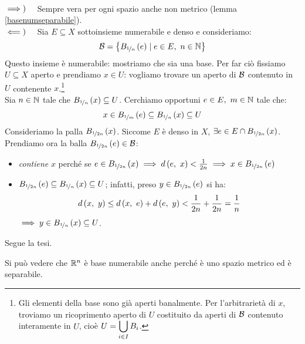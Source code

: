 \begin{demonstration}~{}\\
$\implies)\quad$ Sempre vera per ogni spazio anche non metrico (lemma \ref{basenumseparabile}).\\
$\impliedby)\quad$ Sia $E\subseteq X$ sottoinsieme numerabile e denso e consideriamo:
\begin{equation*}
	\mathcal{B}=\left\{B_{\nicefrac{1}{n}}\left(e\right)\mid e\in E,\ n\in \mathbb{N}\right\}
\end{equation*}
Questo insieme è numerabile: mostriamo che sia una base. Per far ciò fissiamo $U\subseteq X$ aperto e prendiamo $x\in U$: vogliamo trovare un aperto di $\mathcal{B}$ contenuto in $U$ contenente $x$.\footnote{Gli elementi della base sono già aperti banalmente. Per l'arbitrarietà di $x$, troviamo un ricoprimento aperto di $U$ costituito da aperti di $\mathcal{B}$ contenuto interamente in $U$, cioè $\displaystyle U=\mathop{{\bigcup}}\displaylimits_{i\in I}B_i$.}\\
Sia $n\in\mathbb{N}$ tale che $B_{\nicefrac{1}{n}}\left(x\right)\subseteq U$. Cerchiamo opportuni $e\in E,\ m\in\naturalset$ tale che:
\begin{equation*}
x\in B_{\nicefrac{1}{m}}\left(e\right)\subseteq B_{\nicefrac{1}{n}}\left(x\right)\subseteq U
\end{equation*}
Consideriamo la palla $B_{\nicefrac{1}{2n}}\left(x\right)$. Siccome $E$ è denso in $X$, $\exists e\in E\cap B_{\nicefrac{1}{2n}}\left(x\right)$.\\
Prendiamo ora la balla $B_{\nicefrac{1}{2n}}\left(e\right)\in\mathcal{B}$:
\begin{itemize}
	\item \textit{contiene} $x$ perché se $e\in B_{\nicefrac{1}{2n}}\left(x\right)\implies d\left(e,\ x\right)<\frac{1}{2n}\implies x\in B_{\nicefrac{1}{2n}}\left(e\right)$
	\item $B_{\nicefrac{1}{2n}}\left(e\right)\subseteq B_{\nicefrac{1}{n}}\left(x\right)\subseteq U$; infatti, preso $y\in B_{\nicefrac{1}{2n}}\left(e\right)$ si ha:
	\begin{equation*}
		d\left(x,\ y\right)\leq d\left(x,\ e\right)+d\left(e,\ y\right)<\frac{1}{2n}+\frac{1}{2n}=\frac{1}{n}
	\end{equation*}
$\implies y\in B_{\nicefrac{1}{n}}\left(x\right) \subseteq U$.
\end{itemize}
Segue la tesi.
\end{demonstration}
\begin{example}
	Si può vedere che $\mathbb{R}^n$ è base numerabile anche perché è uno spazio metrico ed è separabile.
\end{example}
